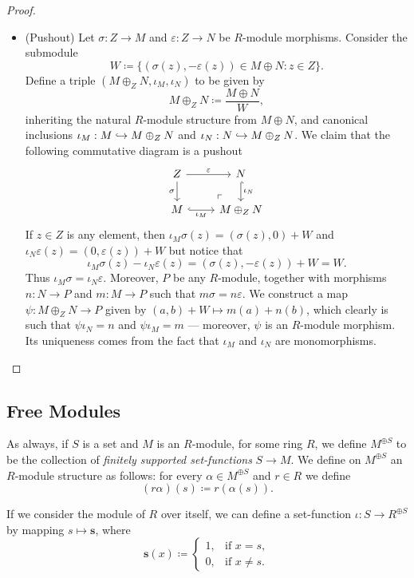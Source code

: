 \begin{proof}
\begin{itemize}
\item (Pushout) Let \(\sigma: Z \to M\) and \(\varepsilon: Z \to N\) be
  \(R\)-module morphisms. Consider the submodule
  \[
  W \coloneq \{(\sigma(z), -\varepsilon(z)) \in M \oplus N \colon
  z \in Z\}.
  \]
  Define a triple \((M \oplus_Z N, \iota_M, \iota_N)\)
  to be given by
  \[
  M \oplus_Z N \coloneq \frac{M \oplus N}{W},
  \]
  inheriting the natural \(R\)-module structure from \(M \oplus N\), and
  canonical inclusions \(\iota_M: M \hookrightarrow M \oplus_Z N\) and
  \(\iota_N: N \hookrightarrow M \oplus_Z N\). We claim that the following commutative
  diagram is a pushout
  \[
  \begin{tikzcd}
  Z \ar[r, "\varepsilon"] \ar[d, "\sigma"']
  \ar[dr, very near end, phantom, "\ulcorner"]
  &N \ar[d, hook, "\iota_N"] \\
  M \ar[r, hook, "\iota_M"'] &M \oplus_Z N
  \end{tikzcd}
  \]
  If \(z \in Z\) is any element, then  \(\iota_M\sigma(z) = (\sigma(z), 0) + W\)
  and \(\iota_N \varepsilon(z) = (0, \varepsilon(z)) + W\) but notice that
  \[
  \iota_M \sigma(z) - \iota_N \varepsilon(z)
  = (\sigma(z), - \varepsilon(z)) + W
  = W.
  \]
  Thus \(\iota_M \sigma = \iota_N \varepsilon\). Moreover, \(P\) be any
  \(R\)-module, together with morphisms \(n: N \to P\) and \(m: M \to P\) such
  that \(m \sigma = n \varepsilon\).  We construct a map
  \(\psi: M \oplus_Z N \to P\) given by \((a, b) + W \mapsto m(a) + n(b)\),
  which clearly is such that \(\psi \iota_N = n\) and \(\psi \iota_M = m\) ---
  moreover, \(\psi\) is an \(R\)-module morphism. Its uniqueness comes from the
  fact that \(\iota_M\) and \(\iota_N\) are monomorphisms.
\end{itemize}
\end{proof}

\subsection{Free Modules}

As always, if \(S\) is a set and \(M\) is an \(R\)-module, for some ring \(R\),
we define \(M^{\oplus S}\) to be the collection of \emph{finitely supported
  set-functions} \(S \to M\). We define on \(M^{\oplus S}\) an \(R\)-module
structure as follows: for every \(\alpha \in M^{\oplus S}\) and \(r \in R\) we
define
\[
(r \alpha)(s) \coloneq r (\alpha(s)).
\]

If we consider the module of \(R\) over itself, we can define a set-function
\(\iota: S \to R^{\oplus S}\) by mapping \(s \mapsto \mathbf{s}\), where
\[
\mathbf{s}(x) \coloneq
\begin{cases}
  1, &\text{if } x = s, \\
  0, &\text{if } x \neq s.
\end{cases}
\]

